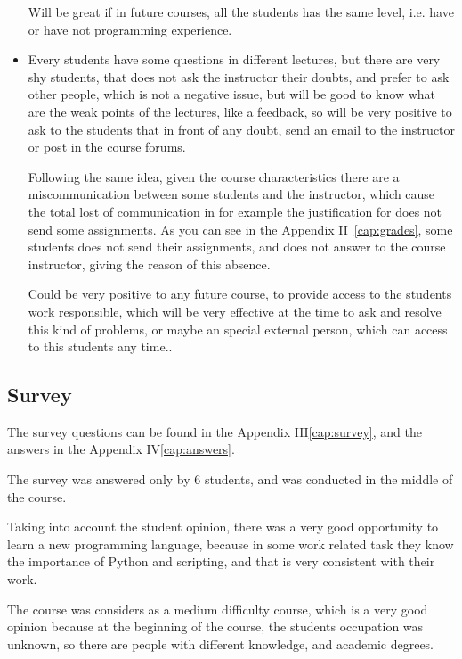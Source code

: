 \documentclass[letter, 10pt]{article}
\begin{document}
\begin{itemize}
          Will be great if in future courses, all the students
          has the same level, i.e. have or have not programming experience.

    \item Every students have some questions in different lectures,
          but there are very shy students, that does not ask the instructor
          their doubts, and prefer to ask other people, which is not
          a negative issue, but will be good to know what are the weak points
          of the lectures, like a feedback, so will be very positive to
          ask to the students that in front of any doubt, send an email
          to the instructor or post in the course forums.

          Following the same idea, given the course characteristics
          there are a miscommunication between some students and the instructor,
          which cause the total lost of communication in for example
          the justification for does not send some assignments.
          As you can see in the Appendix II~\ref{cap:grades},
          some students does not send their assignments,
          and does not answer to the course instructor,
          giving the reason of this absence.

          Could be very positive to any future course,
          to provide access to the students work responsible,
          which will be very effective at the time to ask
          and resolve this kind of problems,
          or maybe an special external person,
          which can access to this students any time..
\end{itemize}

\subsection{Survey}

The survey questions can be found in the Appendix III\ref{cap:survey},
and the answers in the Appendix IV\ref{cap:answers}.

The survey was answered only by 6 students,
and was conducted in the middle of the course. 

Taking into account the student opinion,
there was a very good opportunity to learn a new programming language,
because in some work related task they know the importance of Python and scripting,
and that is very consistent with their work.

The course was considers as a medium difficulty course,
which is a very good opinion because at the beginning of the course,
the students occupation was unknown, so there are people with
different knowledge, and academic degrees.
\end{document}
